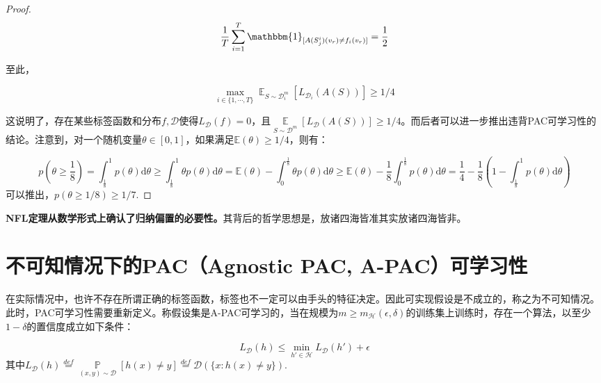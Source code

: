 \documentclass{article}
\newtheorem*{proof}{Proof}
\begin{document}
\begin{proof}
	\begin{equation*}
	\frac{1}{T}\sum_{i=1}^T\mathbbm{1}_{[A(S_j^i)(v_r)\neq f_i(v_r)]}=\frac{1}{2}
	\end{equation*}

	至此，

	\begin{equation*}
	\max_{i\in\{1,\cdots,T\}}\mathop{\mathbb{E}}_{S\sim\mathcal{D}_i^m}[L_{\mathcal{D}_i}(A(S))]\geq 1/4
	\end{equation*}

	这说明了，存在某些标签函数和分布$f,\mathcal{D}$使得$L_\mathcal{D}(f)=0$，且$\mathop{\mathbb{E}}\limits_{S\sim\mathcal{D}^m}[L_\mathcal{D}(A(S))]\geq 1/4$。而后者可以进一步推出违背PAC可学习性的结论。注意到，对一个随机变量$\theta\in[0,1]$，如果满足$\mathbb{E}(\theta)\geq 1/4$，则有：
	
	\begin{equation*}
	p\left(\theta\geq\frac{1}{8}\right)=\int_\frac{1}{8}^1 p(\theta) \mathrm{d}\theta \geq\int_\frac{1}{8}^1 \theta p(\theta) \mathrm{d}\theta=\mathbb{E}(\theta)-\int_0^\frac{1}{8}\theta p(\theta)\mathrm{d}\theta \geq\mathbb{E}(\theta)-\frac{1}{8}\int_0^\frac{1}{8} p(\theta)\mathrm{d}\theta = \frac{1}{4} - \frac{1}{8}\left( 1-\int^1_\frac{1}{8}p(\theta) \mathrm{d}\theta \right)
	\end{equation*}
可以推出，$p(\theta\geq 1/8)\geq 1/7$.
	\end{proof}

	\textbf{NFL定理从数学形式上确认了归纳偏置的必要性。}其背后的哲学思想是，放诸四海皆准其实放诸四海皆非。

\section{不可知情况下的PAC（Agnostic PAC, A-PAC）可学习性}

	在实际情况中，也许不存在所谓正确的标签函数，标签也不一定可以由手头的特征决定。因此可实现假设是不成立的，称之为不可知情况。此时，PAC可学习性需要重新定义。称假设集是A-PAC可学习的，当在规模为$m\geq m_\mathcal{H}(\epsilon,\delta)$的训练集上训练时，存在一个算法，以至少$1-\delta$的置信度成立如下条件：
	
	\begin{equation*}
	L_\mathcal{D}(h)\leq\min\limits_{h'\in\mathcal{H}}L_\mathcal{D}(h')+\epsilon
	\end{equation*}
其中$L_\mathcal{D}(h)\overset{def}{=}\mathop{\mathbb{P}}\limits_{(x,y)\sim\mathcal{D}}[h(x)\neq y]\overset{def}{=}\mathcal{D}(\{x:h(x)\neq y\})$.
\end{document}
